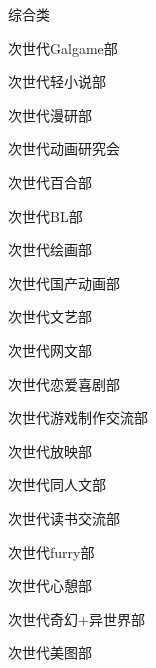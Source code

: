 \begin{multicols}{3}
    \begin{categorysection}{综合类}
        \item 次世代Galgame部
        \item 次世代轻小说部
        \item 次世代漫研部
        \item 次世代动画研究会
        \item 次世代百合部
        \item 次世代BL部
        \item 次世代绘画部
        \item 次世代国产动画部
        \item 次世代文艺部
        \item 次世代网文部
        \item 次世代恋爱喜剧部
        \item 次世代游戏制作交流部
        \item 次世代放映部
        \item 次世代同人文部
        \item 次世代读书交流部
        \item 次世代furry部
        \item 次世代心憩部
        \item 次世代奇幻+异世界部
        \item 次世代美图部
    \end{categorysection}


\end{multicols}
